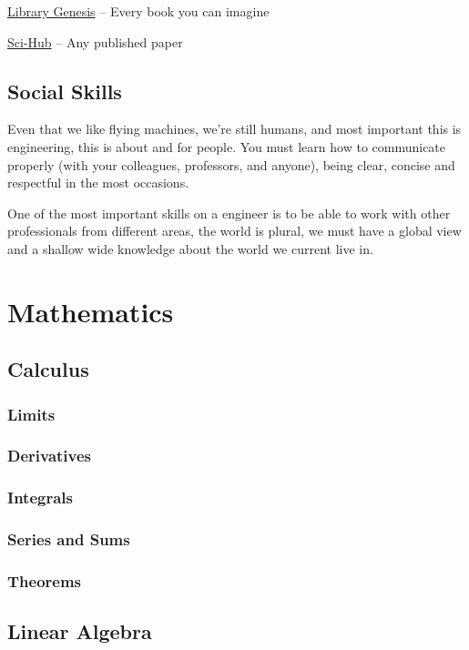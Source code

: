 \begin{description}
    \item{\href{https://gen.lib.rus.ce/}{Library Genesis} -- Every book you can imagine}
    \item{\href{https://sci-hub.tw/}{Sci-Hub} -- Any published paper}
\end{description}{}

\section{Social Skills}

Even that we like flying machines, we're still humans,
and most important this is engineering, this is about and for people.
You must learn how to communicate properly (with your colleagues,
professors, and anyone), being clear, concise and respectful in
the most occasions.

One of the most important skills on a engineer is to be able to
work with other professionals from different areas, the world
is plural, we must have a global view and a shallow wide knowledge
about the world we current live in.

\chapter{Mathematics}

\section{Calculus}
\subsection{Limits}
\subsection{Derivatives}
\subsection{Integrals}
\subsection{Series and Sums}
\subsection{Theorems}

\section{Linear Algebra}
